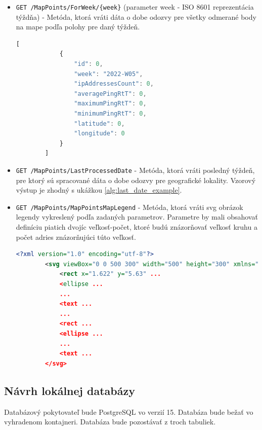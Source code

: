 \begin{itemize}
    \begin{lstlisting}[language={TypeScript},caption={Vzorový výstup z endpointu},label=alg:last_date_example]
        {
            "response": "string"
        }
    \end{lstlisting}
    \item \verb|GET /MapPoints/ForWeek/{week}| (parameter week - ISO 8601 reprezentácia týždňa) - Metóda, ktorá vráti dáta o dobe odozvy pre všetky odmerané body na mape podľa polohy pre daný týždeň. 
    \begin{lstlisting}[language={TypeScript},caption={Vzorový výstup z endpointu},label=alg:get_map_points_info_example]
        [
            {
                "id": 0,
                "week": "2022-W05",
                "ipAddressesCount": 0,
                "averagePingRtT": 0,
                "maximumPingRtT": 0,
                "minimumPingRtT": 0,
                "latitude": 0,
                "longitude": 0
            }
        ]
    \end{lstlisting}
    \item \verb|GET /MapPoints/LastProcessedDate| - Metóda, ktorá vráti posledný týždeň, pre ktorý sú spracované dáta o dobe odozvy pre geografické lokality.
    Vzorový výstup je zhodný s ukážkou \ref{alg:last_date_example}.
    \item \verb|GET /MapPoints/MapPointsMapLegend| - Metóda, ktorá vráti svg obrázok legendy vykreslený podľa zadaných parametrov. Parametre by mali obsahovať 
    definíciu piatich dvojíc veľkosť-počet, ktoré budú znázorňovať veľkosť kruhu a počet adries znázorňujúci túto veľkosť.
    \begin{lstlisting}[language={XML},caption={Vzorový výstup z endpointu},label=alg:legend_example]
        <?xml version="1.0" encoding="utf-8"?>
        <svg viewBox="0 0 500 300" width="500" height="300" xmlns="http://www.w3.org/2000/svg">
            <rect x="1.622" y="5.63" ...
            <ellipse ...
            ...
            <text ...
            ...
            <rect ...
            <ellipse ...
            ...
            <text ...
        </svg>
    \end{lstlisting}
\end{itemize}

\subsection{Návrh lokálnej databázy}
Databázový pokytovateľ bude PostgreSQL vo verzií 15. Databáza bude bežať vo vyhradenom kontajneri. Databáza bude pozostávať z troch tabuliek. 
    
